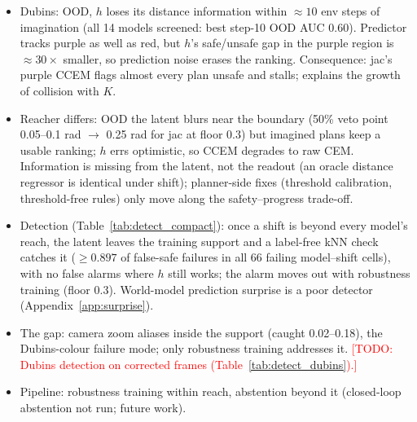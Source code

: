 \documentclass{article}
\newcommand{\todo}[1]{\textcolor{red}{[TODO: #1]}}
\begin{document}
\begin{itemize}
  \item Dubins: OOD, $h$ loses its distance information within $\approx 10$ env steps of imagination (all 14 models screened: best step-10 OOD AUC 0.60). Predictor tracks purple as well as red, but $h$'s safe/unsafe gap in the purple region is $\approx 30\times$ smaller, so prediction noise erases the ranking. Consequence: jac's purple CCEM flags almost every plan unsafe and stalls; explains the growth of collision with $K$.
  \item Reacher differs: OOD the latent blurs near the boundary (50\% veto point 0.05--0.1 rad $\to$ 0.25 rad for jac at floor 0.3) but imagined plans keep a usable ranking; $h$ errs optimistic, so CCEM degrades to raw CEM. Information is missing from the latent, not the readout (an oracle distance regressor is identical under shift); planner-side fixes (threshold calibration, threshold-free rules) only move along the safety--progress trade-off.
  \item Detection (Table~\ref{tab:detect_compact}): once a shift is beyond every model's reach, the latent leaves the training support and a label-free kNN check catches it ($\ge 0.897$ of false-safe failures in all 66 failing model--shift cells), with no false alarms where $h$ still works; the alarm moves out with robustness training (floor 0.3). World-model prediction surprise is a poor detector (Appendix~\ref{app:surprise}).
  \item The gap: camera zoom aliases inside the support (caught 0.02--0.18), the Dubins-colour failure mode; only robustness training addresses it. \todo{Dubins detection on corrected frames (Table~\ref{tab:detect_dubins}).}
  \item Pipeline: robustness training within reach, abstention beyond it (closed-loop abstention not run; future work).
\end{itemize}

\end{document}
